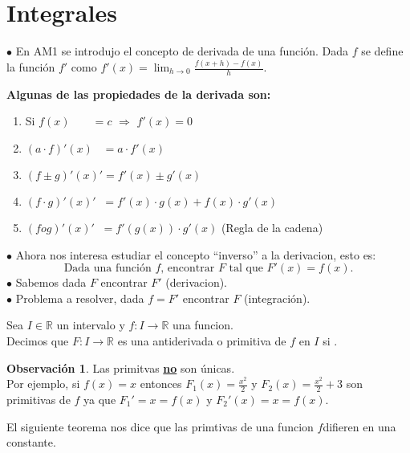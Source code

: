 \documentclass{article}
\theoremstyle{definition}
\theoremstyle{definition}
\newtheorem*{obs}{Observación}
\theoremstyle{remark}
\newcommand\R{\ensuremath{\mathbb{R}}}
\newcommand\fun{$f$\;}
\begin{document}
\tableofcontents

\section{Integrales}
$ \bullet $ En AM1 se introdujo el concepto de derivada de una función. Dada $f$ se define la función $f'$ como $f'(x)=\lim_{h\to0}\frac{f(x+h)-f(x)}{h}$.

\begin{center}
\textbf{Algunas de las propiedades de la derivada son:}
\end{center}

\begin{enumerate}
  \item Si $f(x)\;\;\;\;\;\;\;=c$ \; \quad $\Rightarrow$ \quad \; $f'(x)=0$
  \item $(a \cdot f)'(x) \;\;\;= a\cdot f'(x) $
  \item $(f\pm g)'(x)'   = f'(x)\pm g'(x)$
  \item $(f\cdot g)'(x)' \;\;=f'(x)\cdot g(x)+f(x)\cdot g'(x)$
  \item $(fog)'(x)'      \;\;=f'(g(x))\cdot g'(x)$ \quad \quad (Regla de la cadena)
\end{enumerate}

$\bullet$ Ahora nos interesa estudiar el concepto ``inverso'' a la derivacion, esto es:
\[\boxed{\text{Dada una función $f$, encontrar $F$ tal que $F'(x)=f(x)$.}}\]
$\bullet$ Sabemos dada $F$ encontrar $F'$ (derivacion). \\
$\bullet$ Problema a resolver, dada $f=F'$ encontrar $F$ (integración).

\begin{defi}
  Sea $I \in \R$ un intervalo y $f : I \to \R $ una funcion. \\
  Decimos que $F : I \to \R $ es una antiderivada o primitiva de $f$ en $I$ si
  .
\end{defi}

\begin{obs}
  Las primitvas \underline{\textbf{no}} son únicas. \\
  Por ejemplo, si $f(x)=x$ entonces $F_1(x)=\frac{x^2}{2}$ y $F_2(x)=\frac{x^2}{2}+3$ son primitivas de $f$ ya que $F_1'=x=f(x)$ y $F_2'(x)=x=f(x)$.
\end{obs}

El siguiente teorema nos dice que las primtivas de una funcion \fun difieren en una constante.
\end{document}
